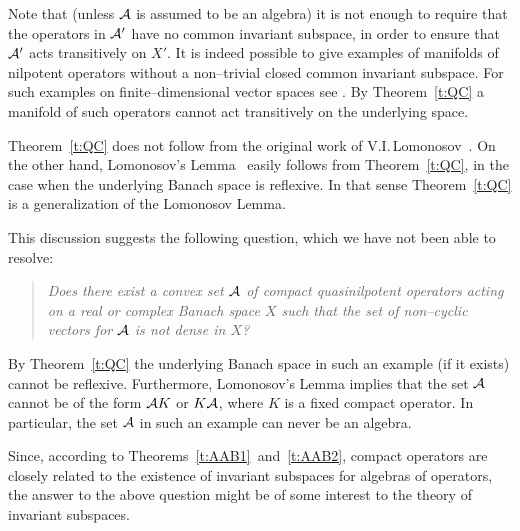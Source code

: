 \goodbreak

\begin{rem}
Note that (unless ${\cal A}$ is assumed to be an algebra) it is not enough to
require that the operators in ${\cal A}'$ have no common invariant subspace, in
order to ensure that ${\cal A}'$ acts transitively on $X'$. It is indeed possible
to give examples of manifolds of nilpotent operators without a non--trivial
closed common invariant subspace. For such examples on finite--dimensional
vector spaces see \cite{MOR91}. By Theorem~\ref{t:QC} a manifold of such
operators cannot act transitively on the underlying space.
\end{rem}

Theorem~\ref{t:QC} does not follow from the original work of
V.I.\,Lomonosov~\cite{Lom73}. On the other hand, Lomonosov's
Lemma~\cite{Lom73} easily follows from Theorem~\ref{t:QC}, in the case when
the underlying Banach space is reflexive. In that sense Theorem~\ref{t:QC} is
a generalization of the Lomonosov Lemma.

{\nobreak This discussion suggests the following question, which we have not
been able to resolve: \nobreak
\begin{quote}
  {\em Does there exist a convex set ${\cal A}$ of compact quasinilpotent
  operators acting on a real or complex Banach space $X$ such that the set
  of non--cyclic vectors for ${\cal A}$ is {\em not} dense in $X$? }
\end{quote}
}

\medskip

By Theorem~\ref{t:QC} the underlying Banach space in such an example (if it
exists) cannot be reflexive. Furthermore, Lomonosov's Lemma implies that the
set ${\cal A}$ cannot be of the form ${\cal A} K$ or $K {\cal A}$, where $K$ is a fixed compact
operator. In particular, the set ${\cal A}$ in such an example can never be an
algebra.

\medskip

Since, according to Theorems~\ref{t:AAB1}~and~\ref{t:AAB2}, compact operators
are closely related to the existence of invariant subspaces for algebras of
operators, the answer to the above question might be of some interest to the
theory of invariant subspaces.

